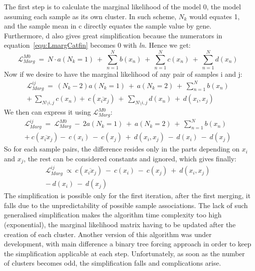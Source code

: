 \documentclass[twocolumn,12pt]{article}
\begin{document}
The first step is to calculate the marginal likelihood of the model 0, the model assuming each sample as its own cluster. In such scheme, $N_k$ would equates 1, and the sample mean in c directly equates the sample value by gene. Furthermore, d also gives great simplification because the numerators in equation~\ref{equ:LmargCatfin} becomes 0 with \emph{ln}.
Hence we get:
\begin{equation}
    \mathcal{L}_{Marg}^{M0}\ =\ N\cdotp a(N_k=1)\ +\ \sum_{n=1}^Nb(x_n)\ +\ \sum_{n=1}^Nc(x_n)\ +\ \sum_{n=1}^Nd(x_n)
    \label{equ:M0}
\end{equation}
Now if we desire to have the marginal likelihood of any pair of samples i and j:
\begin{align}
    \mathcal{L}_{Marg}^{ij}\ =\ (N_k-2)a(N_k=1)\ +\ a(N_k=2)\ +\ \sum_{n=1}^Nb(x_n)\nonumber\\
    +\ \sum_{N\setminus{i,j}}c(x_n) +\  c(\overline{x_ix_j})\ +\ \sum_{N\setminus{i,j}}d(x_n)\ +\ d(x_i,x_j)
\end{align}
We then can express it using $\mathcal{L}_{Marg}^{M0}$:
\begin{align}
    \mathcal{L}_{Marg}^{ij}\ =\ \mathcal{L}_{Marg}^{M0}\ -\ 2a(N_k=1)\ +\ a(N_k=2)\ +\ \sum_{n=1}^Nb(x_n)\nonumber\\ +\ c(\overline{x_ix_j}) -\ c(x_i)\ -\ c(x_j)\ +\ d(x_i,x_j)\ -\ d(x_i)\ -\ d(x_j)
\end{align}
So for each sample pairs, the difference resides only in the parts depending on $x_i$ and $x_j$, the rest can be considered constants and ignored, which gives finally:
\begin{align}
    \mathcal{L}_{Marg}^{ij}\ \propto\ c(\overline{x_ix_j})\ -\ c(x_i)\ -\ c(x_j)\ +\ d(x_i,x_j)\nonumber\\ -\ d(x_i)\ -\ d(x_j)
    \label{equ:simplifMath}
\end{align}
The simplification is possible only for the first iteration, after the first merging, it falls due to the unpredictability of possible sample associations.
The lack of such generalised simplification makes the algorithm time complexity too high (exponential), the marginal likelihood matrix having to be updated after the creation of each cluster.
Another version of this algorithm was under development, with main difference a binary tree forcing approach in order to keep the simplification applicable at each step.
Unfortunately, as soon as the number of clusters becomes odd, the simplification falls and complications arise.
\end{document}
